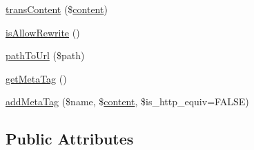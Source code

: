 \begin{DoxyCompactItemize}
\item 
\hyperlink{classContext_a4767b003bd726a994b1bf6bf68a3bb7e}{trans\+Content} (\$\hyperlink{classcontent}{content})
\item 
\hyperlink{classContext_aa11482b69f0892e9e8013e08c9914ff4}{is\+Allow\+Rewrite} ()
\item 
\hyperlink{classContext_a6012ceb6e62fc99b0e2b24e475ba4da7}{path\+To\+Url} (\$path)
\item 
\hyperlink{classContext_a8ee4ad4396e92a54d2aa7d079771619f}{get\+Meta\+Tag} ()
\item 
\hyperlink{classContext_aeae29df3bedc1f90a497d34543a08f7f}{add\+Meta\+Tag} (\$name, \$\hyperlink{classcontent}{content}, \$is\+\_\+http\+\_\+equiv=F\+A\+L\+S\+E)
\end{DoxyCompactItemize}
\subsection*{Public Attributes}
